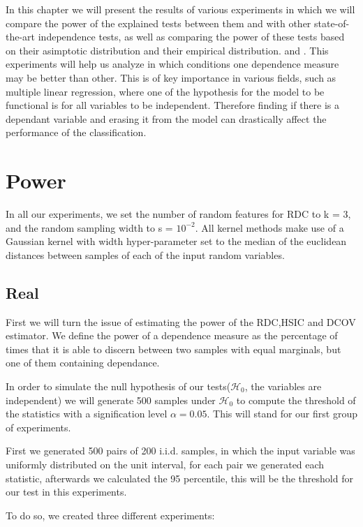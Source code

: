 In this chapter we will present the results of various experiments in which we will compare the power of the explained tests between them and with other state-of-the-art independence tests, as well as comparing the power of these tests based on their asimptotic distribution and their empirical distribution. and \cite{HSICdistribution}. This experiments will help us analyze in which conditions one dependence measure may be better than other.
This is of key importance in various fields, such as multiple linear regression, where one of the hypothesis for the model to be functional is for all variables to be independent. Therefore finding if there is a dependant variable and erasing it from the model can drastically affect the performance of the classification. 

\section{Power}

In all our experiments, we set the number of random features for RDC to k = 3, and the random sampling width to s = $10^{-2}$. All kernel methods make use of a Gaussian kernel with width hyper-parameter set to the median of the euclidean distances between samples of each of the input random variables.

\subsection{Real}
First we will turn the issue of estimating the power of the RDC,HSIC and DCOV estimator. We define the power of a dependence measure as the percentage of times that it is able to discern between two samples with equal marginals, but one of them containing dependance.

In order to simulate the null hypothesis of our tests($\mathcal{H}_{0}$, the variables are independent) we will generate 500 samples under $\mathcal{H}_{0}$ to compute the threshold of the statistics with a signification level $\alpha = 0.05$. This will stand for our first group of experiments.

First we generated 500 pairs  of 200 i.i.d. samples, in which the input variable was uniformly distributed on the unit interval, for each pair we generated each statistic, afterwards we calculated the 95 percentile, this will be the threshold for our test in this experiments.

To do so, we created three different experiments:

